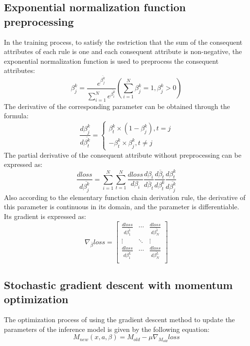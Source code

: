 \documentclass{ieeeaccess}
\begin{document}
\subsection{Exponential normalization function preprocessing}
In the training process, to satisfy the restriction that the sum of the consequent attributes of each rule is one and each consequent attribute is non-negative,
the exponential normalization function is used to preprocess the consequent attributes:
\begin{equation}
    \beta_j^k=\frac{e^{\overline{\beta_j^k}}}{\sum_{i=1}^Ne^{\overline{\beta_i^k}}}(\sum_{i=1}^N\beta_j^k=1,\beta_j^k>0)
\end{equation}
The derivative of the corresponding parameter can be obtained through the formula:
\begin{equation}
    \frac{d\beta_j^k}{d\overline{\beta_t^k}}=
    \left\{
    \begin{aligned}
        \beta_t^k\times(1-\beta_j^k),t=j \\
        -\beta_t^k\times\beta_j^k,t\neq j
    \end{aligned}
    \right.
\end{equation}
The partial derivative of the consequent attribute without preprocessing can be expressed as:
\begin{equation}
    \frac{dloss}{d\overline{\beta_j^k}}=\sum_{i=1}^N\sum_{t=1}^N\frac{dloss}{d\beta_i}\frac{d\beta_i}{d\overline{\beta}_t}\frac{d\overline{\beta}_t}{d\beta_t^k}\frac{d\beta_t^k}{d\overline{\beta_j^k}}
\end{equation}
Also according to the elementary function chain derivation rule, the derivative of this parameter is continuous in its domain,
and the parameter is differentiable. Its gradient is expressed as:
\begin{equation}
    \nabla_{\overline{\beta}}loss=\left[\begin{matrix}
            \frac{dloss}{d\overline{\beta_1^1}} & \cdots & \frac{dloss}{d\overline{\beta_N^1}} \\
            \vdots                              & \ddots & \vdots                              \\
            \frac{dloss}{d\overline{\beta_1^L}} & \cdots & \frac{dloss}{d\overline{\beta_N^L}} \\
        \end{matrix}\right]
\end{equation}


\subsection{Stochastic gradient descent with momentum optimization}
The optimization process of using the gradient descent method to update the parameters of the inference model is given by the following equation:
\begin{equation}
    M_{new}(x,a,\beta)=M_{old}-\mu\nabla_{M_{old}}loss
\end{equation}
\end{document}
